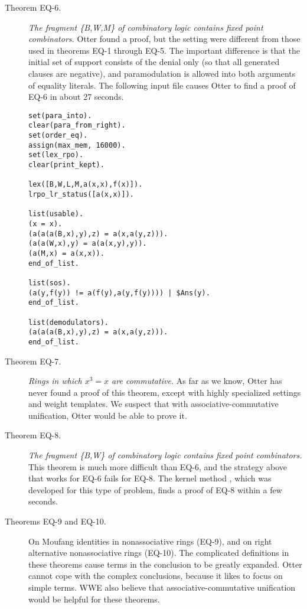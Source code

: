 \begin{description}

\item[Theorem EQ-6.]
{\it The fragment \{B,W,M\} of combinatory logic contains fixed
point combinators.}  Otter found a proof, but the setting were 
different from those used in theorems EQ-1 through EQ-5.
The important difference is that the initial set of support
consists of the denial only (so that all generated clauses are
negative), and paramodulation is allowed into both arguments
of equality literals.  The following input file causes Otter
to find a proof of EQ-6 in about 27 seconds.
{\small
\begin{verbatim}
set(para_into).
clear(para_from_right).
set(order_eq).
assign(max_mem, 16000).
set(lex_rpo).
clear(print_kept).

lex([B,W,L,M,a(x,x),f(x)]).
lrpo_lr_status([a(x,x)]).

list(usable).
(x = x).
(a(a(a(B,x),y),z) = a(x,a(y,z))).
(a(a(W,x),y) = a(a(x,y),y)).
(a(M,x) = a(x,x)).
end_of_list.

list(sos).
(a(y,f(y)) != a(f(y),a(y,f(y)))) | $Ans(y).
end_of_list.

list(demodulators).
(a(a(a(B,x),y),z) = a(x,a(y,z))).
end_of_list.
\end{verbatim}
}

\item[Theorem EQ-7.]
{\it Rings in which $x^3=x$ are commutative.}
As far as we know, Otter has never found a proof of this theorem,
except with highly specialized settings and weight templates.
We suspect that with associative-commutative unification, Otter
would be able to prove it.

\item[Theorem EQ-8.]
{\it The fragment \{B,W\} of combinatory logic contains fixed
point combinators.}
This theorem is much more difficult than EQ-6, and the strategy
above that works for EQ-6 fails for EQ-8.  
The kernel method \cite{presence-absence}, which was developed
for this type of problem, finds a proof of EQ-8 within a few seconds.

\item[Theorems EQ-9 and EQ-10.]
On Moufang identities in nonassociative rings (EQ-9), and
on right alternative nonassociative rings (EQ-10).
The complicated definitions in these theorems cause
terms in the conclusion to be greatly expanded.
Otter cannot cope with the complex conclusions, because it
likes to focus on simple terms.  WWE also believe that
associative-commutative unification would be helpful for
these theorems.

\end{description}

